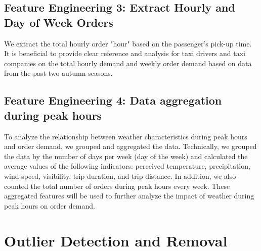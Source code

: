 \documentclass[11pt]{article}
\begin{document}
\subsection{Feature Engineering 3: Extract Hourly and Day of Week Orders } 
We extract the total hourly order "hour" based on the passenger’s pick-up time. It is beneficial to provide clear reference and analysis for taxi drivers and taxi companies on the total hourly demand and weekly order demand based on data from the past two autumn seasons.


\subsection{Feature Engineering 4: Data aggregation during peak hours}

To analyze the relationship between weather characteristics during peak hours and order demand, we grouped and aggregated the data. Technically, we grouped the data by the number of days per week (day of the week) and calculated the average values of the following indicators: perceived temperature, precipitation, wind speed, visibility, trip duration, and trip distance. In addition, we also counted the total number of orders during peak hours every week. These aggregated features will be used to further analyze the impact of weather during peak hours on order demand.

\section{Outlier Detection and Removal}
\end{document}
